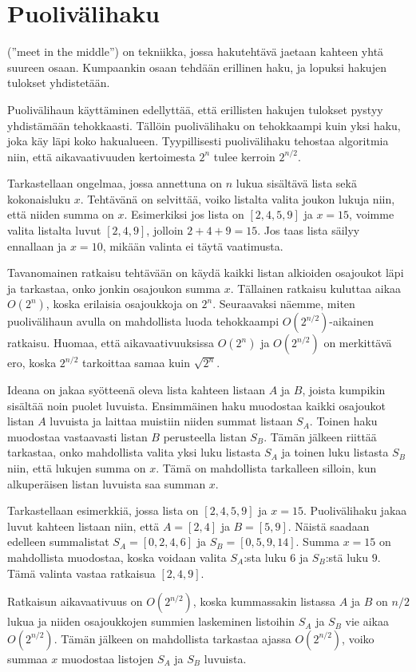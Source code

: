 \section{Puolivälihaku}


 (''meet in the middle'') on tekniikka,
jossa hakutehtävä jaetaan kahteen yhtä suureen osaan.
Kumpaankin osaan tehdään erillinen haku,
ja lopuksi hakujen tulokset yhdistetään.

Puolivälihaun käyttäminen edellyttää,
että erillisten hakujen tulokset pystyy
yhdistämään tehokkaasti.
Tällöin puolivälihaku on tehokkaampi
kuin yksi haku, joka käy läpi koko hakualueen.
Tyypillisesti puolivälihaku tehostaa algoritmia
niin, että aikavaativuuden kertoimesta $2^n$
tulee kerroin $2^{n/2}$.

Tarkastellaan ongelmaa, jossa annettuna
on $n$ lukua sisältävä lista sekä kokonaisluku $x$.
Tehtävänä on selvittää, voiko listalta valita
joukon lukuja niin, että niiden summa on $x$.
Esimerkiksi jos lista on $[2,4,5,9]$ ja $x=15$,
voimme valita listalta luvut $[2,4,9]$,
jolloin $2+4+9=15$.
Jos taas lista säilyy ennallaan ja $x=10$,
mikään valinta ei täytä vaatimusta.

Tavanomainen ratkaisu tehtävään on käydä kaikki
listan alkioiden osajoukot läpi ja tarkastaa,
onko jonkin osajoukon summa $x$.
Tällainen ratkaisu kuluttaa aikaa $O(2^n)$,
koska erilaisia osajoukkoja on $2^n$.
Seuraavaksi näemme,
miten puolivälihaun avulla on mahdollista luoda
tehokkaampi $O(2^{n/2})$-aikainen ratkaisu.
Huomaa, että aikavaativuuksissa $O(2^n)$ ja
$O(2^{n/2})$ on merkittävä ero, koska
$2^{n/2}$ tarkoittaa samaa kuin $\sqrt{2^n}$.

Ideana on jakaa syötteenä oleva lista
kahteen listaan $A$ ja $B$,
joista kumpikin sisältää noin puolet luvuista.
Ensimmäinen haku muodostaa kaikki osajoukot
listan $A$ luvuista ja laittaa muistiin niiden summat
listaan $S_A$.
Toinen haku muodostaa vastaavasti listan
$B$ perusteella listan $S_B$.
Tämän jälkeen riittää tarkastaa,
onko mahdollista valita yksi luku listasta $S_A$
ja toinen luku listasta $S_B$ niin,
että lukujen summa on $x$.
Tämä on mahdollista tarkalleen silloin,
kun alkuperäisen listan luvuista saa summan $x$.

Tarkastellaan esimerkkiä,
jossa lista on $[2,4,5,9]$
ja $x=15$.
Puolivälihaku jakaa luvut kahteen
listaan niin, että $A=[2,4]$
ja $B=[5,9]$.
Näistä saadaan edelleen summalistat
$S_A=[0,2,4,6]$ ja $S_B=[0,5,9,14]$.
Summa $x=15$ on mahdollista muodostaa,
koska voidaan valita $S_A$:sta luku $6$
ja $S_B$:stä luku $9$.
Tämä valinta vastaa ratkaisua $[2,4,9]$.

Ratkaisun aikavaativuus on $O(2^{n/2})$,
koska kummassakin listassa $A$ ja $B$
on $n/2$ lukua ja niiden osajoukkojen
summien laskeminen listoihin $S_A$ ja $S_B$
vie aikaa $O(2^{n/2})$.
Tämän jälkeen on mahdollista tarkastaa
ajassa $O(2^{n/2})$, voiko summaa $x$ muodostaa
listojen $S_A$ ja $S_B$ luvuista.